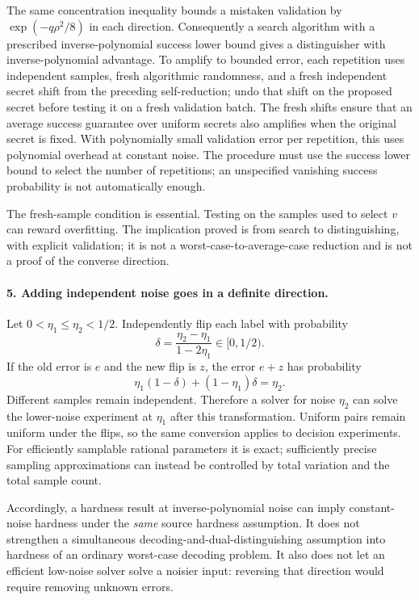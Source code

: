 \documentclass[11pt]{article}
\begin{document}
The same concentration inequality bounds a mistaken validation by $\exp(-q\rho^2/8)$ in each direction. Consequently a search algorithm with a prescribed inverse-polynomial success lower bound gives a distinguisher with inverse-polynomial advantage. To amplify to bounded error, each repetition uses independent samples, fresh algorithmic randomness, and a fresh independent secret shift from the preceding self-reduction; undo that shift on the proposed secret before testing it on a fresh validation batch. The fresh shifts ensure that an average success guarantee over uniform secrets also amplifies when the original secret is fixed. With polynomially small validation error per repetition, this uses polynomial overhead at constant noise. The procedure must use the success lower bound to select the number of repetitions; an unspecified vanishing success probability is not automatically enough.

The fresh-sample condition is essential. Testing on the samples used to select $v$ can reward overfitting. The implication proved is from search to distinguishing, with explicit validation; it is not a worst-case-to-average-case reduction and is not a proof of the converse direction.

\paragraph{5. Adding independent noise goes in a definite direction.}
Let $0<\eta_1\le\eta_2<1/2$. Independently flip each label with probability
\[
 \delta=\frac{\eta_2-\eta_1}{1-2\eta_1}\in[0,1/2).
\]
If the old error is $e$ and the new flip is $z$, the error $e+z$ has probability
\[
 \eta_1(1-\delta)+(1-\eta_1)\delta=\eta_2.
\]
Different samples remain independent. Therefore a solver for noise $\eta_2$ can solve the lower-noise experiment at $\eta_1$ after this transformation. Uniform pairs remain uniform under the flips, so the same conversion applies to decision experiments. For efficiently samplable rational parameters it is exact; sufficiently precise sampling approximations can instead be controlled by total variation and the total sample count.

Accordingly, a hardness result at inverse-polynomial noise can imply constant-noise hardness under the \emph{same} source hardness assumption. It does not strengthen a simultaneous decoding-and-dual-distinguishing assumption into hardness of an ordinary worst-case decoding problem. It also does not let an efficient low-noise solver solve a noisier input: reversing that direction would require removing unknown errors.
\end{document}
